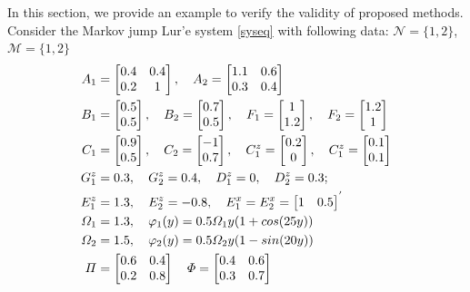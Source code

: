 \documentclass[conference]{IEEEtran}
\begin{document}
In this section, we provide an example to verify the validity of proposed methods. Consider the Markov jump Lur'e system \eqref{syseq} with following data: $\mathcal{N}=\{1,2\}$, $\mathcal{M}=\{1,2\}$
\begin{equation} \notag
	\begin{aligned}
		A_{1}&=\begin{bmatrix}
			0.4&0.4\\
			0.2&1
		\end{bmatrix}, \quad
		A_{2}=\begin{bmatrix}
			1.1&0.6\\
			0.3&0.4
		\end{bmatrix}\\
		B_{1}&=\begin{bmatrix}
		0.5\\0.5
		\end{bmatrix}, \quad
		B_2 = \begin{bmatrix}
		0.7\\0.5
		\end{bmatrix}, \quad
		F_{1}=\begin{bmatrix}
		1\\1.2
		\end{bmatrix},\quad
		F_{2}=\begin{bmatrix}
		1.2\\1
		\end{bmatrix}
		\\
		C_{1}&=\begin{bmatrix}
		0.9\\0.5
		\end{bmatrix},\quad
		C_{2}=\begin{bmatrix}
		-1\\0.7
		\end{bmatrix},\quad
		C^{z}_{1}=\begin{bmatrix}
		0.2\\0
		\end{bmatrix},\quad
		C^{z}_{1}=\begin{bmatrix}
		0.1\\0.1
		\end{bmatrix} \\
		G^{z}_{1}& = 0.3,\quad G^{z}_{2} = 0.4,\quad D^{z}_{1} = 0,\quad D^{z}_{2} = 0.3;\\
		E^{z}_{1}&= 1.3,\quad E^{z}_{2} = -0.8,\quad 	E^{x}_{1} = E^{x}_{2}= \begin{bmatrix} 
			1&0.5
		\end{bmatrix}^{'}\\
		\varOmega_{1}&=1.3, \quad \varphi_{1}(y)=0.5\varOmega_{1}y(1+cos(25y)) \\ 
		\varOmega_{2}&=1.5,\quad \varphi_{2}(y)=0.5\varOmega_{2}y(1-sin(20y)) \\
		\varPi&=\begin{bmatrix}
			0.6&0.4\\
			0.2&0.8
		\end{bmatrix} \quad
		\varPhi=\begin{bmatrix}
			0.4&0.6\\
			0.3&0.7
		\end{bmatrix}
	\end{aligned}  
\end{equation}
\end{document}
